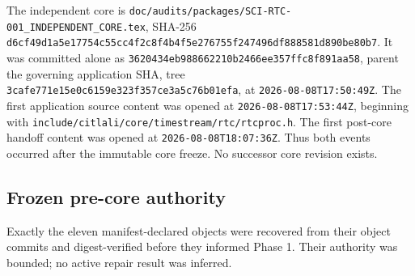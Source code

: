 \documentclass[11pt]{article}
\newcommand{\code}[1]{\nolinkurl{#1}}
\begin{document}
The independent core is
\code{doc/audits/packages/SCI-RTC-001_INDEPENDENT_CORE.tex}, SHA-256
\code{d6cf49d1a5e17754c55cc4f2c8f4b4f5e276755f247496df888581d890be80b7}.
It was committed alone as
\code{3620434eb988662210b2466ee357ffc8f891aa58}, parent the governing
application SHA, tree
\code{3cafe771e15e0c6159e323f357ce3a5c76b01efa}, at
\code{2026-08-08T17:50:49Z}.  The first application source content was opened
at \code{2026-08-08T17:53:44Z}, beginning with
\code{include/citlali/core/timestream/rtc/rtcproc.h}.  The first post-core
handoff content was opened at \code{2026-08-08T18:07:36Z}.  Thus both events
occurred after the immutable core freeze.  No successor core revision exists.

\subsection{Frozen pre-core authority}

Exactly the eleven manifest-declared objects were recovered from their object
commits and digest-verified before they informed Phase 1.  Their authority was
bounded; no active repair result was inferred.
\end{document}
